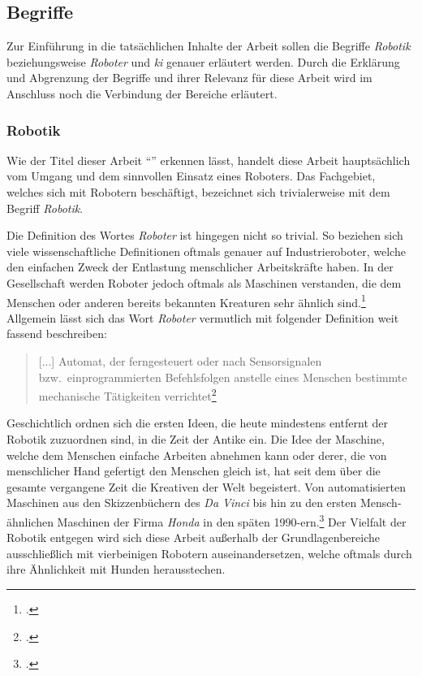 \subsection{Begriffe}
\label{subsec:begriffe}

Zur Einführung in die tatsächlichen Inhalte der Arbeit sollen die Begriffe \emph{Robotik} beziehungsweise \emph{Roboter} und \emph{\gls{ki}} genauer erläutert werden.
Durch die Erklärung und Abgrenzung der Begriffe und ihrer Relevanz für diese Arbeit wird im Anschluss noch die Verbindung der Bereiche erläutert.

\subsubsection{Robotik}
Wie der Titel dieser Arbeit \enquote{\mytitle} erkennen lässt, handelt diese Arbeit hauptsächlich vom Umgang und dem sinnvollen Einsatz eines Roboters.
Das Fachgebiet, welches sich mit Robotern beschäftigt, bezeichnet sich trivialerweise mit dem Begriff \emph{Robotik}.

Die Definition des Wortes \emph{Roboter} ist hingegen nicht so trivial.
So beziehen sich viele wissenschaftliche Definitionen oftmals genauer auf Industrieroboter, welche den einfachen Zweck der Entlastung menschlicher Arbeitskräfte haben.
In der Gesellschaft werden Roboter jedoch oftmals als Maschinen verstanden, die dem Menschen oder anderen bereits bekannten Kreaturen sehr ähnlich sind.\footcite{grundlagen_der_robotik}
Allgemein lässt sich das Wort \emph{Roboter} vermutlich mit folgender Definition weit fassend beschreiben:

\begin{quote}
    [...] Automat, der ferngesteuert oder nach Sensorsignalen bzw.\ einprogrammierten Befehlsfolgen anstelle eines Menschen bestimmte mechanische Tätigkeiten verrichtet\footcite{duden_roboter}
\end{quote}


Geschichtlich ordnen sich die ersten Ideen, die heute mindestens entfernt der Robotik zuzuordnen sind, in die Zeit der Antike ein.
Die Idee der Maschine, welche dem Menschen einfache Arbeiten abnehmen kann oder derer, die von menschlicher Hand gefertigt den Menschen gleich ist, hat seit dem über die gesamte vergangene Zeit die Kreativen der Welt begeistert.
Von automatisierten Maschinen aus den Skizzenbüchern des \emph{Da Vinci} bis hin zu den ersten Mensch-ähnlichen Maschinen der Firma \emph{Honda} in den späten \num{1990}-ern.\footcite{grundlagen_der_robotik}
Der Vielfalt der Robotik entgegen wird sich diese Arbeit außerhalb der Grundlagenbereiche ausschließlich mit vierbeinigen Robotern auseinandersetzen, welche oftmals durch ihre Ähnlichkeit mit Hunden herausstechen.

